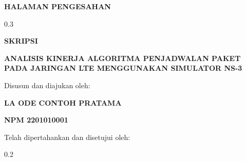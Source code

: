 \thispagestyle{empty}
\begin{tengah}
\textbf{HALAMAN PENGESAHAN}
\end{tengah}
\begin{ruang}{0.3}\end{ruang}
\begin{tengah}
\textbf{SKRIPSI}

\textbf{ANALISIS KINERJA ALGORITMA PENJADWALAN PAKET PADA JARINGAN LTE MENGGUNAKAN SIMULATOR NS-3}

Disusun dan diajukan oleh:

\textbf{LA ODE CONTOH PRATAMA}

\textbf{NPM 2201010001}

Telah dipertahankan dan disetujui oleh:
\end{tengah}
\begin{ruang}{0.2}\end{ruang}
